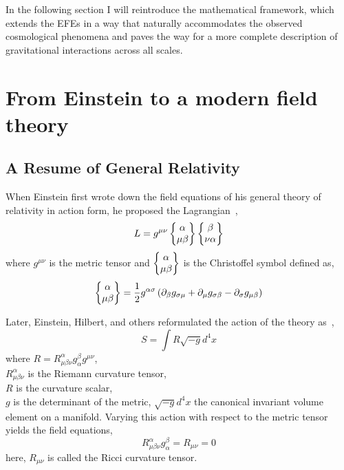 \documentclass[aps,prd,preprint]{revtex4-1}
\begin{document}
In the following section I will reintroduce the mathematical framework, which extends the EFEs in a way that naturally accommodates the observed cosmological phenomena and paves the way for a more complete description of gravitational interactions across all scales.

\section{From Einstein to a modern field theory}
\subsection*{A Resume of General Relativity}
When Einstein first wrote down the field equations of his general theory of relativity in action form, he proposed the Lagrangian~\cite{Einstein_1915,Einstein_1916},
\begin{equation}\label{Einstein_1915}
    L = g^{\mu\nu} \left\{ \begin{matrix} \alpha \\ \mu \beta \end{matrix} \right\} \left\{ \begin{matrix} \beta \\ \nu \alpha \end{matrix} \right\}
\end{equation}
where $g^{\mu\nu}$ is the metric tensor and $\left\{ \begin{matrix} \alpha \\ \mu \beta \end{matrix} \right\}$ is the Christoffel symbol defined as,
\begin{equation}\label{christoffel}
    \left\{ \begin{matrix} \alpha \\ \mu \beta \end{matrix} \right\} = \frac{1}{2} g^{\alpha\sigma} \left(\partial_{\beta}g_{\sigma\mu} + \partial_{\mu}g_{\sigma\beta} - \partial_{\sigma}g_{\mu\beta}\right)
\end{equation}

Later, Einstein, Hilbert, and others reformulated the action of the theory as~\cite{Hilbert_1915,misner_2017},
\begin{equation}\label{Einstein-Hilbert_action}
    S=\int{R \sqrt{-g} d^4x}
\end{equation}
where $R = R^{\alpha}_{\mu\beta\nu}g^{\beta}_{\alpha}g^{\mu\nu}$, \\
$R^{\alpha}_{\mu\beta\nu}$ is the Riemann curvature tensor, \\
$R$ is the curvature scalar, \\
$g$ is the determinant of the metric, $\sqrt{-g} d^4x$ the canonical invariant volume element on a manifold.
Varying this action with respect to the metric tensor yields the field equations,
\begin{equation}\label{EFEs}
    R^{\alpha}_{\mu\beta\nu}g^{\beta}_{\alpha} = R_{\mu\nu} = 0
\end{equation}
here, $R_{\mu\nu}$ is called the Ricci curvature tensor.
\end{document}

